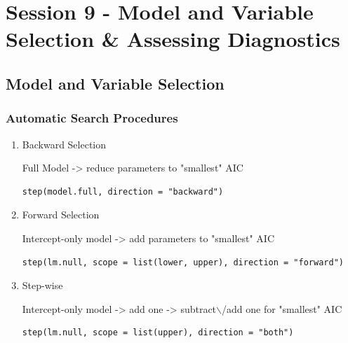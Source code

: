 \documentclass[11pt]{article}
\begin{document}
\section{Session 9 - Model and Variable Selection \& Assessing Diagnostics}
\label{sec:org8bdaa89}
\subsection{Model and Variable Selection}
\label{sec:org93de4a9}
\subsubsection{Automatic Search Procedures}
\label{sec:org6efb3cf}
\begin{enumerate}
\item Backward Selection
\label{sec:org7dc1dd5}

Full Model -> reduce parameters to "smallest" AIC

\begin{verbatim}
step(model.full, direction = "backward")
\end{verbatim}

\item Forward Selection
\label{sec:org016a897}

Intercept-only model -> add parameters to "smallest" AIC

\begin{verbatim}
step(lm.null, scope = list(lower, upper), direction = "forward")
\end{verbatim}

\item Step-wise
\label{sec:org468d675}

Intercept-only model -> add one -> subtract$\backslash$/add one for "smallest" AIC

\begin{verbatim}
step(lm.null, scope = list(upper), direction = "both")
\end{verbatim}
\end{enumerate}
\end{document}
